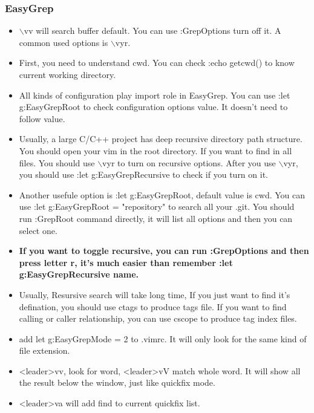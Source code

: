 \documentclass[a4paper,11pt,twoside]{book}
\begin{document}
\subsubsection{EasyGrep}
\begin{itemize}
        \item $\backslash$vv will search buffer default. You can use :GrepOptions turn off it. A common used options is $\backslash$vyr.

		\item First, you need to understand cwd. You can check :echo getcwd() to know current working directory. 

		\item All kinds of configuration play import role in EasyGrep. You can use :let g:EasyGrepRoot to check configuration options value. It doesn't need to follow value.

		\item Usually, a large C/C++ project has deep recursive directory path structure. You should open your vim in the root directory. If you want to find in all files. You should use $\backslash$vyr to turn on recursive options. After you use $\backslash$vyr, you should use :let g:EasyGrepRecursive to check if you turn on it.

		\item Another usefule option is :let g:EasyGrepRoot, default value is cwd. You can use :let g:EasyGrepRoot = "repository" to search all your .git.  You should run :GrepRoot command directly, it will list all options and then you can select one.

		\item \textbf{If you want to toggle recursive, you can run :GrepOptions and then press letter r, it's much easier than remember :let g:EasyGrepRecursive name.} 

		\item Usually, Resursive search will take long time, If you just want to find it's defination, you should use ctags to produce tags file. If you want to find calling or caller relationship, you can use cscope to produce tag index files. 

		\item add let g:EasyGrepMode = 2 to .vimrc. It will only look for the same kind of file extension. 

		\item <leader>vv, look for word,  <leader>vV match whole word. It will show all the result below the window, just like quickfix mode.
 
				
		\item <leader>va will add find to current quickfix list. 


\end{itemize}
\end{document}
